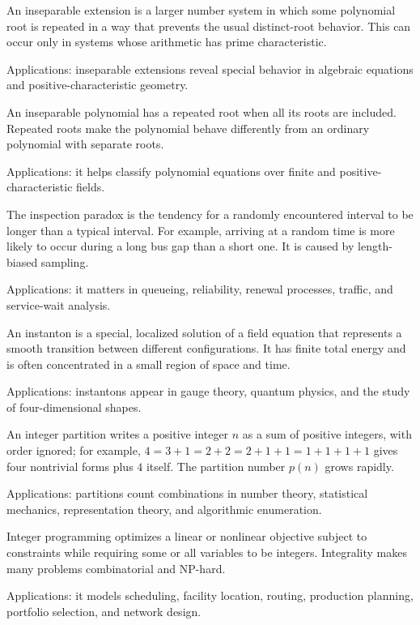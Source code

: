 An inseparable extension is a larger number system in which some polynomial root is repeated in a way that prevents the usual distinct-root behavior. This can occur only in systems whose arithmetic has prime characteristic. \par\noindent Applications: inseparable extensions reveal special behavior in algebraic equations and positive-characteristic geometry.

An inseparable polynomial has a repeated root when all its roots are included. Repeated roots make the polynomial behave differently from an ordinary polynomial with separate roots. \par\noindent Applications: it helps classify polynomial equations over finite and positive-characteristic fields.

The inspection paradox is the tendency for a randomly encountered interval to be longer than a typical interval. For example, arriving at a random time is more likely to occur during a long bus gap than a short one. It is caused by length-biased sampling. \par\noindent Applications: it matters in queueing, reliability, renewal processes, traffic, and service-wait analysis.

An instanton is a special, localized solution of a field equation that represents a smooth transition between different configurations. It has finite total energy and is often concentrated in a small region of space and time. \par\noindent Applications: instantons appear in gauge theory, quantum physics, and the study of four-dimensional shapes.

An integer partition writes a positive integer $n$ as a sum of positive integers, with order ignored; for example, $4=3+1=2+2=2+1+1=1+1+1+1$ gives four nontrivial forms plus $4$ itself. The partition number $p(n)$ grows rapidly. \par\noindent Applications: partitions count combinations in number theory, statistical mechanics, representation theory, and algorithmic enumeration.

Integer programming optimizes a linear or nonlinear objective subject to constraints while requiring some or all variables to be integers. Integrality makes many problems combinatorial and NP-hard. \par\noindent Applications: it models scheduling, facility location, routing, production planning, portfolio selection, and network design.

